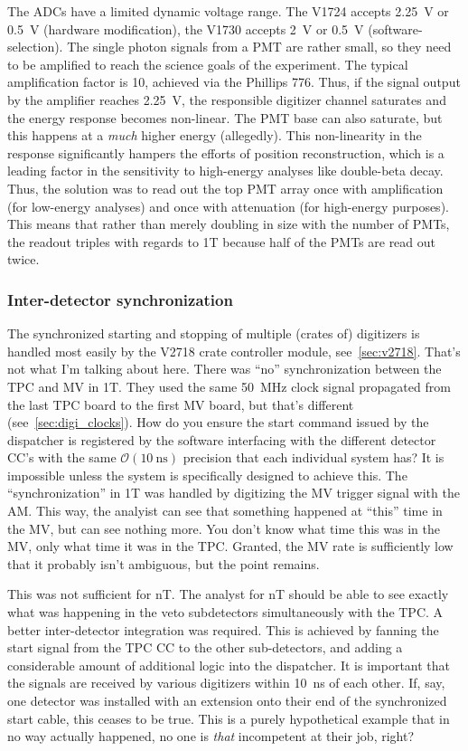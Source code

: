 The ADCs have a limited dynamic voltage range.
The V1724 accepts \SI{2.25}{\volt} or \SI{0.5}{\volt} (hardware modification), the V1730 accepts \SI{2}{\volt} or \SI{0.5}{\volt} (software-selection).
The single photon signals from a PMT are rather small, so they need to be amplified to reach the science goals of the experiment.
The typical amplification factor is 10, achieved via the Phillips 776.
Thus, if the signal output by the amplifier reaches \SI{2.25}{\volt}, the responsible digitizer channel saturates and the energy response becomes non-linear.
The PMT base can also saturate, but this happens at a \emph{much} higher energy (allegedly).
This non-linearity in the response significantly hampers the efforts of position reconstruction, which is a leading factor in the sensitivity to high-energy analyses like double-beta decay.
Thus, the solution was to read out the top PMT array once with amplification (for low-energy analyses) and once with attenuation (for high-energy purposes).
This means that rather than merely doubling in size with the number of PMTs, the readout triples with regards to 1T because half of the PMTs are read out twice.

\subsubsection{Inter-detector synchronization}

The synchronized starting and stopping of multiple (crates of) digitizers is handled most easily by the V2718 crate controller module, see~\ref{sec:v2718}.
That's not what I'm talking about here.
There was ``no'' synchronization between the TPC and MV in 1T.
They used the same \SI{50}{\mega\hertz} clock signal propagated from the last TPC board to the first MV board, but that's different (see~\ref{sec:digi_clocks}).
How do you ensure the start command issued by the dispatcher is registered by the software interfacing with the different detector CC's with the same $\mathcal{O}(\SI{10}{\nano\second})$ precision that each individual system has?
It is impossible unless the system is specifically designed to achieve this.
The ``synchronization'' in 1T was handled by digitizing the MV trigger signal with the AM.
This way, the analyist can see that something happened at ``this'' time in the MV, but can see nothing more.
You don't know what time this was in the MV, only what time it was in the TPC.
Granted, the MV rate is sufficiently low that it probably isn't ambiguous, but the point remains.

This was not sufficient for nT.
The analyst for nT should be able to see exactly what was happening in the veto subdetectors simultaneously with the TPC.
A better inter-detector integration was required.
This is achieved by fanning the start signal from the TPC CC to the other sub-detectors, and adding a considerable amount of additional logic into the dispatcher.
It is important that the signals are received by various digitizers within \SI{10}{\nano\second} of each other.
If, say, one detector was installed with an extension onto their end of the synchronized start cable, this ceases to be true.
This is a purely hypothetical example that in no way actually happened, no one is \emph{that} incompetent at their job, right?

